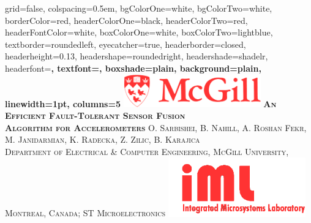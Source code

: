 \documentclass[landscape,final,a0paper,fontscale=0.285]{baposter}
\begin{document}
\begin{poster}%
  {
  grid=false,
  colspacing=0.5em,
  bgColorOne=white,
  bgColorTwo=white,
  borderColor=red,
  headerColorOne=black,
  headerColorTwo=red,
  headerFontColor=white,
  boxColorOne=white,
  boxColorTwo=lightblue,
  textborder=roundedleft,
  eyecatcher=true,
  headerborder=closed,
  headerheight=0.13\textheight,
  headershape=roundedright,
  headershade=shadelr,
  headerfont=\Large\bf\textsc, %
  textfont={\setlength{\parindent}{1.5em}},
  boxshade=plain,
  background=plain,
  linewidth=1pt,
  columns=5
  }
  {\includegraphics[width=16em]{images/mcgill_logo}} 
  {\bf\textsc{\larger An Efficient Fault-Tolerant Sensor Fusion \\ \vspace{0.2em} Algorithm for Accelerometers}\vspace{0.3em} }
  {\smaller \textsc{O. Sarbishei, B. Nahill, A. Roshan Fekr, M. Janidarmian, K. Radecka, Z. Zilic, B. Karajica \\
  {\footnotesize Department of Electrical \& Computer Engineering, McGill University, Montreal, Canada; ST Microelectronics}
  }}
  {\includegraphics[width=16em]{images/logo_iml_red}}


    \newcommand{\colouredcircle}{%
      \tikz{\useasboundingbox (-0.2em,-0.32em) rectangle(0.2em,0.32em); \draw[draw=black,fill=lightblue,line width=0.03em] (0,0) circle(0.18em);}}



\end{poster}
\end{document}
